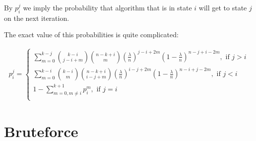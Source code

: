 \documentclass{article}
\begin{document}
By $p_i^j$ we imply the probability that algorithm that is in state $i$ will get to state $j$ on the next iteration.

The exact value of this probabilities is quite complicated:

\begin{align*}
  p_i^j = \begin{cases}
    \sum\limits_{m = 0}^{k - j} \binom{k - i}{j - i + m} \binom{n - k + i}{m} \left(\frac{\lambda}{n}\right)^{j - i + 2m} \left(1 - \frac{\lambda}{n}\right)^{n - j + i - 2m}, \text{ if } j > i \\
      \sum\limits_{m = 0}^{k - i} \binom{k - i}{m} \binom{n - k + i}{i - j + m} \left(\frac{\lambda}{n}\right)^{i - j + 2m} \left(1 - \frac{\lambda}{n}\right)^{n - i + j - 2m}, \text{ if } j < i \\
      1 - \sum\limits_{m = 0, m \ne i}^{k + 1} p_i^m, \text{ if } j = i \\
  \end{cases}
\end{align*}
\section{Bruteforce}
\end{document}
